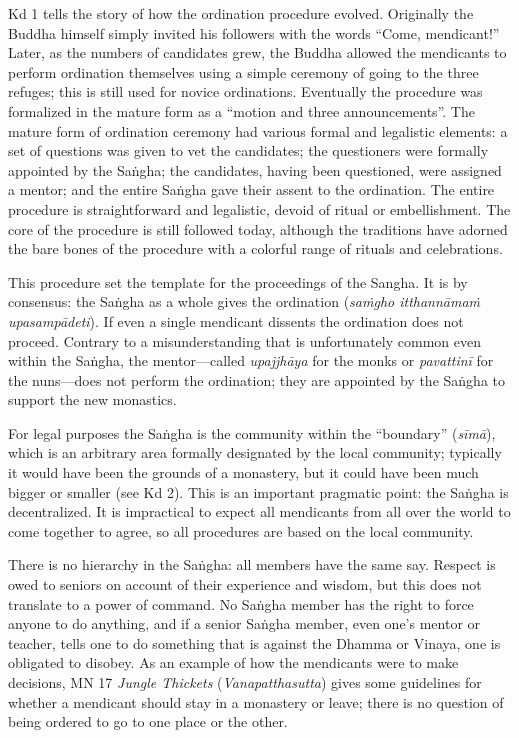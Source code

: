 \documentclass[12pt,openany]{book}%
\begin{document}
Kd 1 tells the story of how the ordination procedure evolved. Originally the Buddha himself simply invited his followers with the words “Come, mendicant!” Later, as the numbers of candidates grew, the Buddha allowed the mendicants to perform ordination themselves using a simple ceremony of going to the three refuges; this is still used for novice ordinations. Eventually the procedure was formalized in the mature form as a “motion and three announcements”. The mature form of ordination ceremony had various formal and legalistic elements: a set of questions was given to vet the candidates; the questioners were formally appointed by the \textsanskrit{Saṅgha}; the candidates, having been questioned, were assigned a mentor; and the entire \textsanskrit{Saṅgha} gave their assent to the ordination. The entire procedure is straightforward and legalistic, devoid of ritual or embellishment. The core of the procedure is still followed today, although the traditions have adorned the bare bones of the procedure with a colorful range of rituals and celebrations.

This procedure set the template for the proceedings of the Sangha. It is by consensus: the \textsanskrit{Saṅgha} as a whole gives the ordination (\emph{\textsanskrit{saṁgho} \textsanskrit{itthannāmaṁ} \textsanskrit{upasampādeti}}). If even a single mendicant dissents the ordination does not proceed. Contrary to a misunderstanding that is unfortunately common even within the \textsanskrit{Saṅgha}, the mentor—called \textit{\textsanskrit{upajjhāya}} for the monks or \textit{\textsanskrit{pavattinī}} for the nuns—does not perform the ordination; they are appointed by the \textsanskrit{Saṅgha} to support the new monastics.

For legal purposes the \textsanskrit{Saṅgha} is the community within the “boundary” (\textit{\textsanskrit{sīmā}}), which is an arbitrary area formally designated by the local community; typically it would have been the grounds of a monastery, but it could have been much bigger or smaller (see Kd 2). This is an important pragmatic point: the \textsanskrit{Saṅgha} is decentralized. It is impractical to expect all mendicants from all over the world to come together to agree, so all procedures are based on the local community.

There is no hierarchy in the \textsanskrit{Saṅgha}: all members have the same say. Respect is owed to seniors on account of their experience and wisdom, but this does not translate to a power of command. No \textsanskrit{Saṅgha} member has the right to force anyone to do anything, and if a senior \textsanskrit{Saṅgha} member, even one’s mentor or teacher, tells one to do something that is against the Dhamma or Vinaya, one is obligated to disobey. As an example of how the mendicants were to make decisions, MN 17 \textit{Jungle Thickets} (\textit{Vanapatthasutta}) gives some guidelines for whether a mendicant should stay in a monastery or leave; there is no question of being ordered to go to one place or the other.
\end{document}
